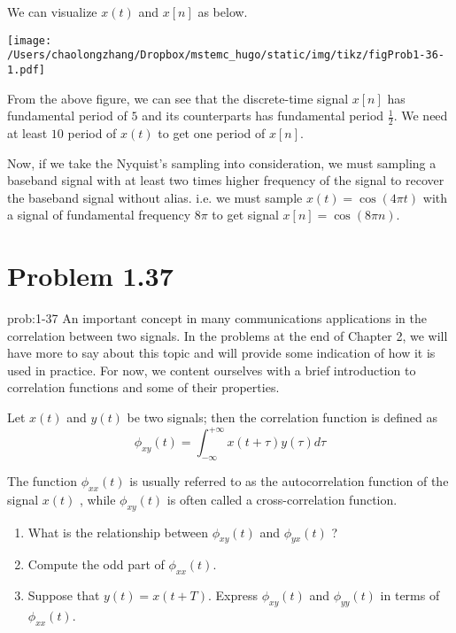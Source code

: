\documentclass[koma,a4paper,utopia,12pt,listings-color,microtype,paralist,colorlinks,urlcolor=red]{org-article}
\begin{document}
We can visualize \(x(t)\) and \(x[n]\) as below.

\begin{center}
\texttt{[image: /Users/chaolongzhang/Dropbox/mstemc\_hugo/static/img/tikz/figProb1-36-1.pdf]}
\end{center}

From the above figure, we can see that the discrete-time signal \(x[n]\) has
fundamental period of \(5\) and its counterparts has fundamental period
\(\frac{1}{2}\). We need at least \(10\) period of \(x(t)\) to get one period of
\(x[n]\).

Now, if we take the Nyquist's sampling into consideration, we must sampling a
baseband signal with at least two times higher frequency of the signal to
recover the baseband signal without alias. i.e. we must sample \(x(t) =
\cos(4\pi t)\) with a signal of fundamental frequency \(8\pi\) to get signal
\(x[n] = \cos(8\pi n)\).
\section{Problem 1.37}
\label{sec:org62dbfe6}


\begin{prob}[]{prob:1-37}
An important concept in many communications applications in the correlation
between two signals. In the problems at the end of Chapter 2, we will have
more to say about this topic and will provide some indication of how it is
used in practice. For now, we content ourselves with a brief introduction to
correlation functions and some of their properties.

Let \(x(t)\) and \(y(t)\) be two signals; then the correlation function is
defined as
\begin{equation*}
\phi_{xy}(t) = \int_{-\infty}^{+\infty} x(t+ \tau) y(\tau)d\tau
\end{equation*}

The function \(\phi_{xx}(t)\) is usually referred to as the autocorrelation
function of the signal \(x(t)\) , while \(\phi_{xy}(t)\) is often called a
cross-correlation function.

\begin{enumerate}
\item What is the relationship between \(\phi_{xy}(t)\) and \(\phi_{yx}(t)\) ?
\item Compute the odd part of \(\phi_{xx}(t)\).
\item Suppose that \(y(t)= x(t+ T)\). Express \(\phi_{xy}(t)\) and
\(\phi_{yy}(t)\) in terms of \(\phi_{xx}(t)\).
\end{enumerate}
\label{prob:1-37}
\end{prob}
\end{document}
